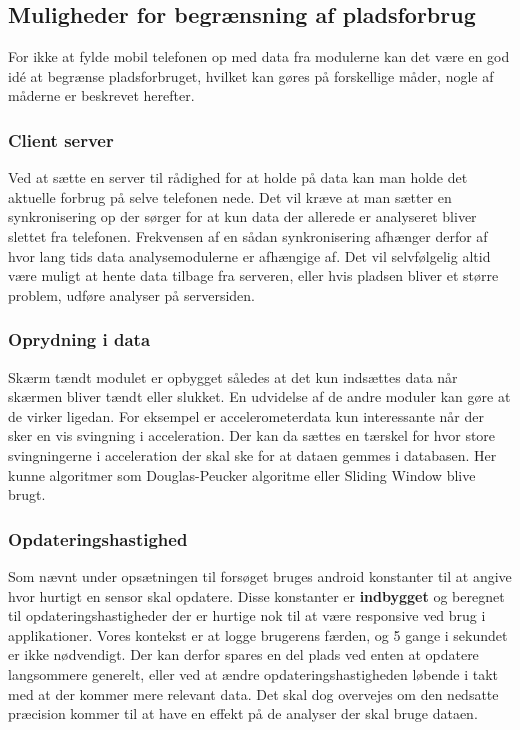 \subsection{Muligheder for begrænsning af pladsforbrug}
For ikke at fylde mobil telefonen op med data fra modulerne kan det være en god idé at begrænse pladsforbruget, hvilket kan gøres på forskellige måder, nogle af måderne er beskrevet herefter.

\subsubsection{Client server}
Ved at sætte en server til rådighed for at holde på data kan man holde det aktuelle forbrug på selve telefonen nede.
Det vil kræve at man sætter en synkronisering op der sørger for at kun data der allerede er analyseret bliver slettet fra telefonen. 
Frekvensen af en sådan synkronisering afhænger derfor af hvor lang tids data analysemodulerne er afhængige af.
Det vil selvfølgelig altid være muligt at hente data tilbage fra serveren, eller hvis pladsen bliver et større problem, udføre analyser på serversiden.

\subsubsection{Oprydning i data}
Skærm tændt modulet er opbygget således at det kun indsættes data når skærmen bliver tændt eller slukket.
En udvidelse af de andre moduler kan gøre at de virker ligedan. 
For eksempel er accelerometerdata kun interessante når der sker en vis svingning i acceleration.
Der kan da sættes en tærskel for hvor store svingningerne i acceleration der skal ske for at dataen gemmes i databasen.
Her kunne algoritmer som Douglas-Peucker algoritme eller Sliding Window blive brugt. 

\subsubsection{Opdateringshastighed}
Som nævnt under opsætningen til forsøget bruges android konstanter til at angive hvor hurtigt en sensor skal opdatere.
Disse konstanter er \textbf{indbygget} og beregnet til opdateringshastigheder der er hurtige nok til at være responsive ved brug i applikationer.
Vores kontekst er at logge brugerens færden, og 5 gange i sekundet er ikke nødvendigt.
Der kan derfor spares en del plads ved enten at opdatere langsommere generelt, eller ved at ændre opdateringshastigheden løbende i takt med at der kommer mere relevant data.
Det skal dog overvejes om den nedsatte præcision kommer til at have en effekt på de analyser der skal bruge dataen.


